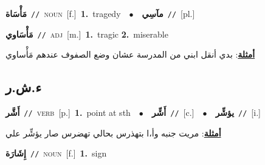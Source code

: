 \documentclass[10pt,a4paper,twoside]{article} %
\begin{document}
\begin{multicols}{2}
{\setlength\topsep{0pt}\textbf{\foreignlanguage{arabic}{مَأْسَاة}}\ {\color{gray}\texttt{//}\color{black}}\ \textsc{noun}\ [f.]\ \textbf{1.}~tragedy\ \ $\bullet$\ \ \setlength\topsep{0pt}\textbf{\foreignlanguage{arabic}{مآسِي}}\ {\color{gray}\texttt{//}\color{black}}\ [pl.]\ } \vspace{2mm}

{\setlength\topsep{0pt}\textbf{\foreignlanguage{arabic}{مَأْسَاوي}}\ {\color{gray}\texttt{//}\color{black}}\ \textsc{adj}\ [m.]\ \textbf{1.}~tragic  \textbf{2.}~miserable\  \begin{flushright}\color{gray}\foreignlanguage{arabic}{\textbf{\underline{\foreignlanguage{arabic}{أمثلة}}}: بدي أنقل ابني من المدرسة عشان وضع الصفوف عندهم مَأْساوي}\end{flushright}\color{black}} \vspace{2mm}

\vspace{-3mm}
\subsection*{\color{blue}\foreignlanguage{arabic}{ء.ش.ر}\color{blue}{}} 

{\setlength\topsep{0pt}\textbf{\foreignlanguage{arabic}{أَشَّر}}\ {\color{gray}\texttt{//}\color{black}}\ \textsc{verb}\ [p.]\ \textbf{1.}~point at sth\ \ $\bullet$\ \ \setlength\topsep{0pt}\textbf{\foreignlanguage{arabic}{أَشِّر}}\ {\color{gray}\texttt{//}\color{black}}\ [c.]\ \ $\bullet$\ \ \setlength\topsep{0pt}\textbf{\foreignlanguage{arabic}{يؤشِّر}}\ {\color{gray}\texttt{//}\color{black}}\ [i.]\  \begin{flushright}\color{gray}\foreignlanguage{arabic}{\textbf{\underline{\foreignlanguage{arabic}{أمثلة}}}: مريت جنبه وأ،ا بتهذرس بحالي تهضرس صار يؤشِّر علي}\end{flushright}\color{black}} \vspace{2mm}

{\setlength\topsep{0pt}\textbf{\foreignlanguage{arabic}{إِشَارَة}}\ {\color{gray}\texttt{//}\color{black}}\ \textsc{noun}\ [f.]\ \textbf{1.}~sign\ } \vspace{2mm}


\end{multicols}
\end{document}

